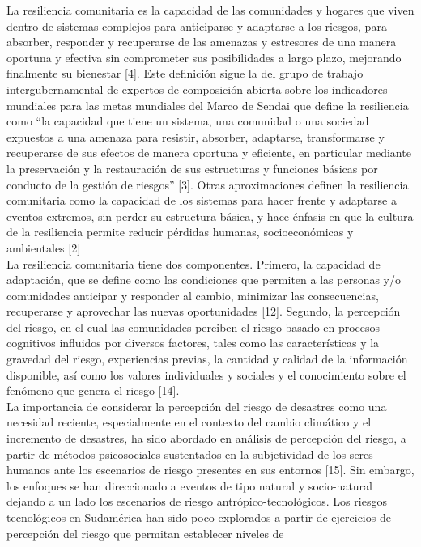 \documentclass[
  letterpaper,
]{book}
\begin{document}
La resiliencia comunitaria es la capacidad de las comunidades y hogares
que viven dentro de sistemas complejos para anticiparse y adaptarse a
los riesgos, para absorber, responder y recuperarse de las amenazas y
estresores de una manera oportuna y efectiva sin comprometer sus
posibilidades a largo plazo, mejorando finalmente su bienestar {[}4{]}.
Este definición sigue la del grupo de trabajo intergubernamental de
expertos de composición abierta sobre los indicadores mundiales para las
metas mundiales del Marco de Sendai que define la resiliencia como ``la
capacidad que tiene un sistema, una comunidad o una sociedad expuestos a
una amenaza para resistir, absorber, adaptarse, transformarse y
recuperarse de sus efectos de manera oportuna y eficiente, en particular
mediante la preservación y la restauración de sus estructuras y
funciones básicas por conducto de la gestión de riesgos'' {[}3{]}. Otras
aproximaciones definen la resiliencia comunitaria como la capacidad de
los sistemas para hacer frente y adaptarse a eventos extremos, sin
perder su estructura básica, y hace énfasis en que la cultura de la
resiliencia permite reducir pérdidas humanas, socioeconómicas y
ambientales {[}2{]}\\
La resiliencia comunitaria tiene dos componentes. Primero, la capacidad
de adaptación, que se define como las condiciones que permiten a las
personas y/o comunidades anticipar y responder al cambio, minimizar las
consecuencias, recuperarse y aprovechar las nuevas oportunidades
{[}12{]}. Segundo, la percepción del riesgo, en el cual las comunidades
perciben el riesgo basado en procesos cognitivos influidos por diversos
factores, tales como las características y la gravedad del riesgo,
experiencias previas, la cantidad y calidad de la información
disponible, así como los valores individuales y sociales y el
conocimiento sobre el fenómeno que genera el riesgo {[}14{]}.\\
La importancia de considerar la percepción del riesgo de desastres como
una necesidad reciente, especialmente en el contexto del cambio
climático y el incremento de desastres, ha sido abordado en análisis de
percepción del riesgo, a partir de métodos psicosociales sustentados en
la subjetividad de los seres humanos ante los escenarios de riesgo
presentes en sus entornos {[}15{]}. Sin embargo, los enfoques se han
direccionado a eventos de tipo natural y socio-natural dejando a un lado
los escenarios de riesgo antrópico-tecnológicos. Los riesgos
tecnológicos en Sudamérica han sido poco explorados a partir de
ejercicios de percepción del riesgo que permitan establecer niveles de
\end{document}
